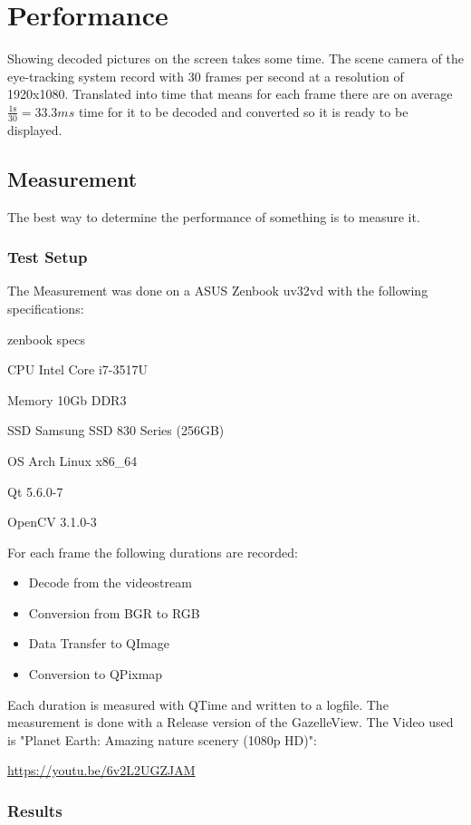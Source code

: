 \chapter{Performance}
\label{chap:performance}
Showing decoded pictures on the screen takes some time. The scene camera of the eye-tracking system record with 30 frames per second at a resolution of 1920x1080. Translated into time that means for each frame there are on average $\displaystyle\frac{\mbox{1s}}{\mbox{30}}=33.3ms$ time for it to be decoded and converted so it is ready to be displayed. 

\section{Measurement}
\label{sec:measurement}
The best way to determine the performance of something is to measure it. 
\subsection{Test Setup}
\label{sec:testSetup}
The Measurement was done on a ASUS Zenbook uv32vd with the following specifications:
\begin{labeling}{zenbook specs}
	\item [CPU] Intel Core i7-3517U
	\item [Memory] 10Gb DDR3
	\item [SSD] Samsung SSD 830 Series (256GB)
	\item [OS]	Arch Linux x86\_64
	\item [Qt] 5.6.0-7
	\item [OpenCV] 3.1.0-3
\end{labeling}
For each frame the following durations are recorded:
\begin{itemize}
	\item Decode from the videostream
	\item Conversion from \gls{BGR} to \gls{RGB}
	\item Data Transfer to QImage
	\item Conversion to QPixmap
\end{itemize}

Each duration is measured with QTime and written to a logfile. The measurement is done with a Release version of the GazelleView. The Video used is "Planet Earth: Amazing nature scenery (1080p HD)":

{\centering 
	\url{https://youtu.be/6v2L2UGZJAM} \par
}
\subsection{Results}
\label{sec:results}


